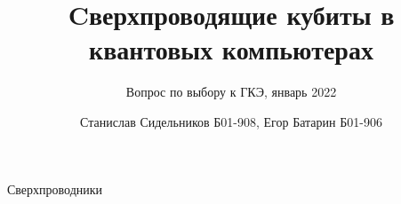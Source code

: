 \documentclass{beamer}
\title{Cверхпроводящие кубиты в квантовых компьютерах}
\subtitle{Вопрос по выбору к ГКЭ, январь 2022}
\author{Станислав Сидельников Б01-908, Егор Батарин Б01-906}
\institute{Московский физико-технический институт}
\date{}
\begin{document}
	
	\begin{frame}
		\titlepage
	\end{frame}

	\begin{frame}
		Сверхпроводники
	\end{frame}
	
\end{document}
